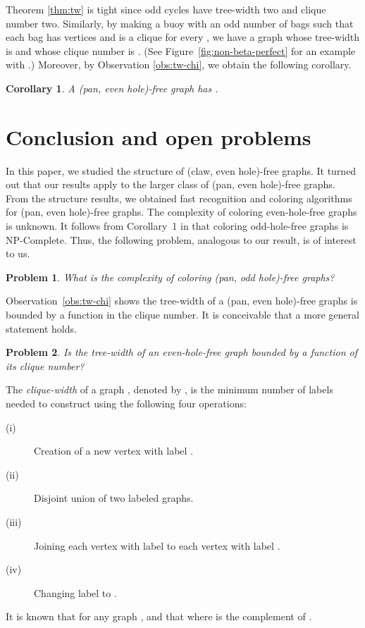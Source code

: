 \documentclass[11pt,a4paper]{article}
\newtheorem{corollary}[theorem]{Corollary}
\newtheorem{problem}{Problem}[section]
\begin{document}
Theorem \ref{thm:tw} is tight since odd cycles  have tree-width two
and clique number two. Similarly, by making a buoy with an odd
number of bags such that each bag has  vertices and  is a clique for every , we have a graph whose
tree-width is  and whose clique number is . (See
Figure~\ref{fig:non-beta-perfect} for an example with .)
Moreover, by Observation \ref{obs:tw-chi}, we obtain the following
corollary.

\begin{corollary}\label{cor:chi-boundedness}
A (pan, even hole)-free graph  has .
\hfill 
\end{corollary}

\section{Conclusion and open problems}\label{sec:conclusions}
In this paper, we studied the structure of (claw, even hole)-free
graphs. It turned out that our results apply to the larger class of
(pan, even hole)-free graphs. From the structure results, we
obtained fast recognition and coloring algorithms for (pan, even
hole)-free graphs. The complexity of coloring even-hole-free
graphs is unknown.  It follows from Corollary~1 in
\cite{KraKra2001} that coloring odd-hole-free graphs is
NP-Complete. Thus, the following problem, analogous to our result,
is of interest to us.
\begin{problem}\label{pro:odd-hole}
What is the complexity of coloring (pan, odd hole)-free graphs?
\end{problem}
Observation~\ref{obs:tw-chi} shows the tree-width of a (pan, even
hole)-free graphs is bounded by a function in the clique number.
It is conceivable that a more general statement holds.
\begin{problem}\label{pro:tree-width}
Is the tree-width of an even-hole-free graph bounded by a function
of its clique number?
\end{problem}

The {\it clique-width} of a graph , denoted by , is the
minimum number of labels needed to construct  using the
following four operations:
\begin{description}
 \item[(i)] Creation of a new vertex  with label .
 \item[(ii)] Disjoint union of two labeled graphs.
 \item[(iii)] Joining each vertex with
label  to each vertex with label .
 \item[(iv)] Changing label  to .

\end{description}
It is known \cite{CorRot2005} that for any graph ,  and that \cite{CouOla2000}  where  is the complement of .
\end{document}
